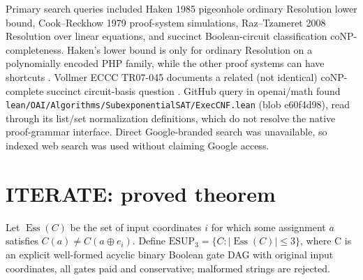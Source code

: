\documentclass[11pt]{article}
\begin{document}
Primary search queries included Haken 1985 pigeonhole ordinary Resolution lower bound, Cook--Reckhow 1979 proof-system simulations, Raz--Tzameret 2008 Resolution over linear equations, and succinct Boolean-circuit classification coNP-completeness. Haken's lower bound is only for ordinary Resolution on a polynomially encoded PHP family, while the other proof systems can have shortcuts \cite{Haken1985,CookReckhow1979,RazTzameret2008}. Vollmer ECCC TR07-045 documents a related (not identical) coNP-complete succinct circuit-basis question \cite{Vollmer2007}. GitHub query in openai/math found \texttt{lean/OAI/Algorithms/SubexponentialSAT/ExecCNF.lean} (blob e60f4d98), read through its list/set normalization definitions, which do not resolve the native proof-grammar interface. Direct Google-branded search was unavailable, so indexed web search was used without claiming Google access.

\section*{ITERATE: proved theorem}
Let \(\operatorname{Ess}(C)\) be the set of input coordinates \(i\) for which some assignment \(a\) satisfies \(C(a)\ne C(a\oplus e_i)\).
Define \(\mathrm{ESUP}_3=\{C:|\operatorname{Ess}(C)|\le3\}\), where C is an explicit well-formed acyclic binary Boolean gate DAG with original input coordinates, all gates paid and conservative; malformed strings are rejected.
\end{document}
